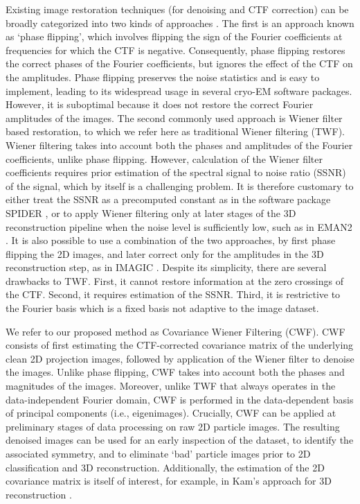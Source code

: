 \documentclass[review]{elsarticle}
\begin{document}
Existing image restoration techniques (for denoising and CTF correction) can be 
broadly categorized into two kinds of approaches \cite{Penczek_image}.
The first is an approach known as `phase flipping', which involves 
flipping the sign of the Fourier coefficients at frequencies for which the CTF 
is negative.
Consequently, phase flipping restores the correct phases of the Fourier 
coefficients, but ignores the effect of the CTF on the
amplitudes. Phase flipping preserves the noise statistics and is easy to 
implement, leading to its widespread usage in several cryo-EM software packages.
However, it is suboptimal because it does not restore the correct
Fourier amplitudes of the images. The second commonly used approach is Wiener 
filter based restoration, to which we refer here as traditional Wiener filtering (TWF). 
Wiener filtering takes into account both the phases and amplitudes
of the Fourier coefficients, unlike phase flipping. However, calculation of the 
Wiener filter coefficients requires prior estimation
of the spectral signal to noise ratio (SSNR) of the signal, which by itself is a challenging 
problem. It is therefore customary to either
treat the SSNR as a precomputed constant as in the software package SPIDER 
\cite{spider}, or to
apply Wiener filtering only at later stages of the 3D reconstruction pipeline 
when the noise level is sufficiently low, such as in
EMAN2 \cite{eman2}. It is also possible to use a combination of the two 
approaches, by first phase flipping the 2D images,
and later correct only for the amplitudes in the 3D reconstruction step, as in 
IMAGIC \cite{imagic, imagic2}. Despite its simplicity,
there are several drawbacks to TWF. First, it cannot restore information at the 
zero 
crossings of the CTF. Second, it requires estimation of the SSNR. Third, it is
restrictive to the Fourier basis which is a fixed basis not adaptive to the 
image dataset.

We refer to our proposed method as Covariance
Wiener Filtering (CWF). CWF consists
of first estimating the CTF-corrected covariance matrix of the underlying clean 
2D projection images, followed by application of the Wiener filter
to denoise the images. Unlike phase flipping, CWF takes into 
account both the phases and magnitudes
of the images. Moreover, unlike TWF that always operates in the data-independent 
Fourier domain, CWF is performed in the data-dependent basis of principal 
components (i.e., eigenimages).
Crucially, CWF can be applied at preliminary
stages of data processing on raw 2D particle images. The resulting denoised 
images can be used for an early inspection of the dataset,
to identify the associated symmetry, and to eliminate `bad' particle images 
prior to 2D classification and 3D reconstruction. Additionally, the estimation 
of the
2D covariance matrix is itself of interest, for example, in Kam's approach for 
3D reconstruction \cite{kam1980, or}.
\end{document}
